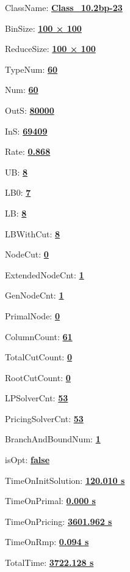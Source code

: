 \documentclass[11pt]{article}
\begin{document}
\pagestyle{empty}


ClassName: \underline{\textbf{Class_10.2bp-23}}
\par
BinSize: \underline{\textbf{100 × 100}}
\par
ReduceSize: \underline{\textbf{100 × 100}}
\par
TypeNum: \underline{\textbf{60}}
\par
Num: \underline{\textbf{60}}
\par
OutS: \underline{\textbf{80000}}
\par
InS: \underline{\textbf{69409}}
\par
Rate: \underline{\textbf{0.868}}
\par
UB: \underline{\textbf{8}}
\par
LB0: \underline{\textbf{7}}
\par
LB: \underline{\textbf{8}}
\par
LBWithCut: \underline{\textbf{8}}
\par
NodeCut: \underline{\textbf{0}}
\par
ExtendedNodeCnt: \underline{\textbf{1}}
\par
GenNodeCnt: \underline{\textbf{1}}
\par
PrimalNode: \underline{\textbf{0}}
\par
ColumnCount: \underline{\textbf{61}}
\par
TotalCutCount: \underline{\textbf{0}}
\par
RootCutCount: \underline{\textbf{0}}
\par
LPSolverCnt: \underline{\textbf{53}}
\par
PricingSolverCnt: \underline{\textbf{53}}
\par
BranchAndBoundNum: \underline{\textbf{1}}
\par
isOpt: \underline{\textbf{false}}
\par
TimeOnInitSolution: \underline{\textbf{120.010 s}}
\par
TimeOnPrimal: \underline{\textbf{0.000 s}}
\par
TimeOnPricing: \underline{\textbf{3601.962 s}}
\par
TimeOnRmp: \underline{\textbf{0.094 s}}
\par
TotalTime: \underline{\textbf{3722.128 s}}
\par
\newpage


\end{document}
